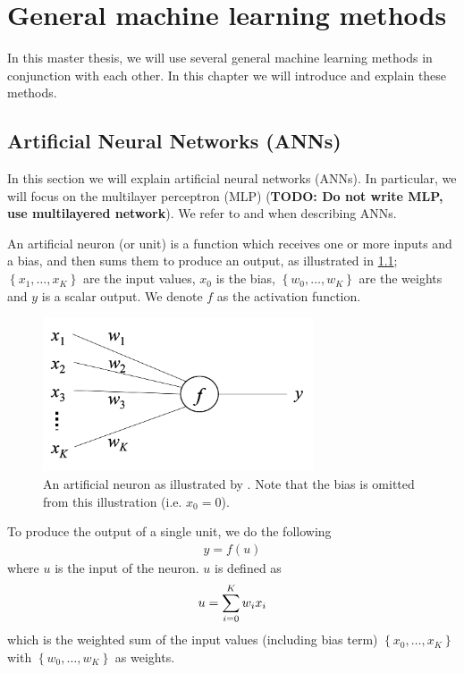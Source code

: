 \chapter{General machine learning methods}
In this master thesis, we will use several general machine learning methods in conjunction with each other. In this chapter we will introduce and explain these methods.

\section{Artificial Neural Networks (ANNs)}
In this section we will explain artificial neural networks (ANNs). In particular, we will focus on the multilayer perceptron (MLP) (\textbf{TODO: Do not write MLP, use multilayered network}). We refer to \cite[Chapter 1]{Aggarwal18} and \cite{rong2016word2vec} when describing ANNs.

\begin{definition}
An artificial neuron (or unit) is a function which receives one or more inputs and a bias, and then sums them to produce an output, as illustrated in \cref{fig:artificial_neuron}; $\left\{ x_1, \ldots, x_K \right\}$ are the input values, $x_0$ is the bias, $\left\{ w_0, \ldots, w_K \right\}$ are the weights and $y$ is a scalar output. We denote $f$ as the activation function.
\end{definition}

\begin{figure}
    \centering
    \includegraphics[width=8cm]{thesis/figures/artificial-neuron-rong-2014.png}
    \caption{An artificial neuron as illustrated by \cite[Figure 5]{rong2016word2vec}. Note that the bias is omitted from this illustration (i.e. $x_0=0$).}
    \label{fig:artificial_neuron}
\end{figure}

To produce the output of a single unit, we do the following
\begin{align}
    y = f(u)
\end{align}
where $u$ is the input of the neuron. $u$ is defined as
\begin{align}
    u = \sum\limits_{i=0}^{K} w_i x_i
\end{align}
which is the weighted sum of the input values (including bias term) $\left\{ x_0, \ldots, x_K \right\}$ with $\left\{ w_0, \ldots, w_K \right\}$ as weights.

